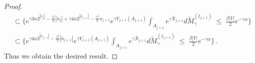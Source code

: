 \documentclass[10pt,a4paper]{amsart}
\newcommand{\ab}{|}
\renewcommand{\leq}{\;\leqslant\;}                   %
\renewcommand{\tilde}{\widetilde}          %
\begin{document}
\begin{proof}
\begin{align*}
&  \subset \big\{ e^{\gamma 3 \alpha 2^{| \bar n_{j} | }  - \frac{\gamma^2}{2} |\bar n_{j}| + \gamma 4 \alpha 2^{|\bar n_{j+1}|} - \frac{\gamma^2}{2} n_{j+1} } e^{\gamma Y_{j+1}(A_{j+1})} \int_{A_{j+1}}e^{\gamma \bar X_{j+1}}  d \tilde M_\gamma^{(t_{j+1})} \leq \tfrac{\beta \ab V \ab }{2} e^{-\gamma \alpha} \big\} \\
& \subset \big\{ e^{\gamma 4 \alpha 2^{|\bar n_{j+1}\ab } - \frac{\gamma^2}{2} |\bar n_{j+1}|} e^{\gamma Y_{j+1}(A_{j+1})} \int_{A_{j+1}}e^{\gamma \bar X_{j+1}}  d \tilde M_\gamma^{(t_{j+1})} \leq \tfrac{\beta \ab V \ab }{2} e^{-\gamma \alpha} \big\}\,.
\end{align*}
Thus we obtain the desired result.

\end{proof}
\end{document}
